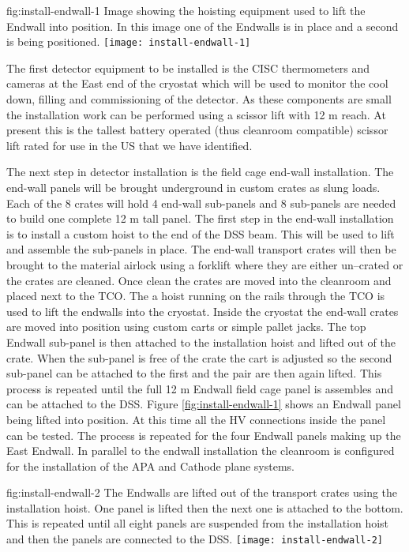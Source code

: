 \begin{dunefigure}{fig:install-endwall-1}
  {Image showing the hoisting equipment used to lift the Endwall into position. In this image one of the Endwalls is in place and a second is being positioned.}
\texttt{[image: install-endwall-1]}
\end{dunefigure}

The first detector equipment to be installed is the CISC thermometers and cameras at the East end of the cryostat which will be used to monitor the cool down, filling and commissioning of the detector. As these components are small the installation work can be performed using a scissor lift with 12 \si{m} reach. 
At present this is the tallest battery operated (thus cleanroom compatible) scissor lift rated for use in the US that we have identified.

The next step in detector installation is the field cage end-wall installation. 
The end-wall panels will be brought underground in custom crates as slung loads. 
Each of the 8 crates will hold 4 end-wall sub-panels and 8 sub-panels are needed to build one complete 12 \si{m} tall panel.  
The first step in the end-wall installation is to install a custom hoist to the end of the DSS beam. 
This will be used to lift and assemble the sub-panels in place. 
The end-wall transport crates will then be brought to the material airlock using a forklift where they are either un--crated or the crates are cleaned. 
Once clean the crates are moved into the cleanroom and placed next to the TCO. The a hoist running on the rails through the TCO is used to lift the endwalls into the cryostat.
Inside the cryostat the end-wall crates are moved into position using custom carts or simple pallet jacks.
The top Endwall sub-panel is then attached to the installation hoist and lifted out of the crate. When the sub-panel is free of the crate the cart is adjusted so the second sub-panel can be attached to the first and the pair are then again lifted. This process is repeated until the full 12 \si{m} Endwall field cage panel is assembles and can be attached to the DSS. 
Figure \ref{fig:install-endwall-1} shows an Endwall panel being lifted into position.
At this time all the HV connections inside the panel can be tested. The process is repeated for the four Endwall panels making up the East Endwall. 
In parallel to the endwall installation the cleanroom is configured for the installation of the APA and Cathode plane systems.

\begin{dunefigure}{fig:install-endwall-2}
  {The Endwalls are lifted out of the transport crates using the installation hoist. One panel is lifted then the next one is attached to the bottom. This is repeated until all eight panels are suspended from the installation hoist and then the panels are connected to the DSS.}
\texttt{[image: install-endwall-2]}
\end{dunefigure}


